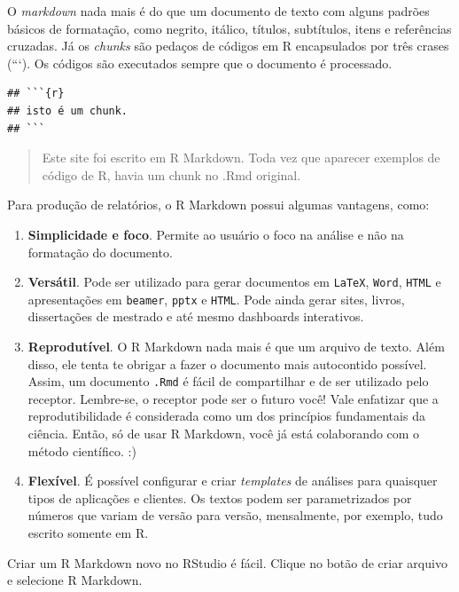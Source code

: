 \documentclass[
]{book}
\providecommand{\tightlist}{%
  \setlength{\itemsep}{0pt}\setlength{\parskip}{0pt}}
\begin{document}
O \emph{markdown} nada mais é do que um documento de texto com alguns padrões básicos de formatação, como negrito, itálico, títulos, subtítulos, itens e referências cruzadas. Já os \emph{chunks} são pedaços de códigos em R encapsulados por três crases (```). Os códigos são executados sempre que o documento é processado.

\begin{verbatim}
## ```{r}
## isto é um chunk. 
## ```
\end{verbatim}

\begin{quote}
Este site foi escrito em R Markdown. Toda vez que aparecer exemplos de código de R, havia um chunk no .Rmd original.
\end{quote}

Para produção de relatórios, o R Markdown possui algumas vantagens, como:

\begin{enumerate}
\def\labelenumi{\arabic{enumi}.}
\tightlist
\item
  \textbf{Simplicidade e foco}. Permite ao usuário o foco na análise e não na formatação do documento.
\item
  \textbf{Versátil}. Pode ser utilizado para gerar documentos em \texttt{LaTeX}, \texttt{Word}, \texttt{HTML} e apresentações em \texttt{beamer}, \texttt{pptx} e \texttt{HTML}. Pode ainda gerar sites, livros, dissertações de mestrado e até mesmo dashboards interativos.
\item
  \textbf{Reprodutível}. O R Markdown nada mais é que um arquivo de texto. Além disso, ele tenta te obrigar a fazer o documento mais autocontido possível. Assim, um documento \texttt{.Rmd} é fácil de compartilhar e de ser utilizado pelo receptor. Lembre-se, o receptor pode ser o futuro você! Vale enfatizar que a reprodutibilidade é considerada como um dos princípios fundamentais da ciência. Então, só de usar R Markdown, você já está colaborando com o método científico. :)
\item
  \textbf{Flexível}. É possível configurar e criar \emph{templates} de análises para quaisquer tipos de aplicações e clientes. Os textos podem ser parametrizados por números que variam de versão para versão, mensalmente, por exemplo, tudo escrito somente em R.
\end{enumerate}

Criar um R Markdown novo no RStudio é fácil. Clique no botão de criar arquivo e selecione R Markdown.
\end{document}
